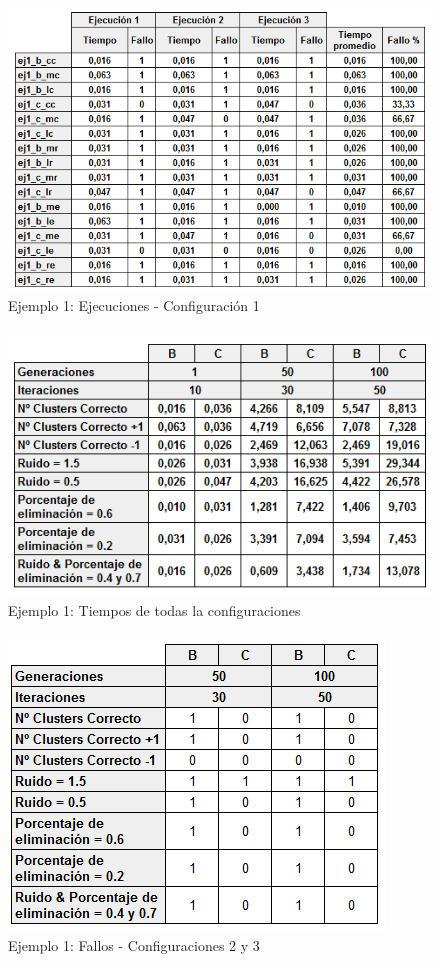\documentclass[conference,a4paper]{IEEEtran}
\begin{document}
\begin{figure}[H]
\centering
\includegraphics[scale=0.5]{Experimentacion/Ejemplo1/Ejemplo1Ejecuciones}
\caption{Ejemplo 1: Ejecuciones - Configuración 1}
\end{figure}

\begin{figure}[H]
\centering
\includegraphics[scale=0.6]{Experimentacion/Ejemplo1/Ejemplo1Completo}
\caption{Ejemplo 1: Tiempos de todas la configuraciones}
\end{figure}

\begin{figure}[H]
\centering
\includegraphics[scale=0.7]{Experimentacion/Ejemplo1/Ejemplo1Fallos}
\caption{Ejemplo 1: Fallos - Configuraciones 2 y 3}
\end{figure}
\end{document}
